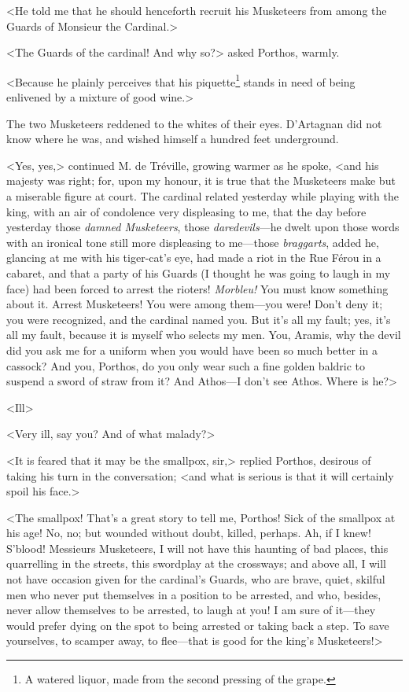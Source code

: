 <He told me that he should henceforth recruit his Musketeers from among the Guards of Monsieur the Cardinal.> 

<The Guards of the cardinal! And why so?> asked Porthos, warmly. 

<Because he plainly perceives that his piquette\footnote{A watered liquor, made from the second pressing of the grape.} stands in need of being enlivened by a mixture of good wine.> 

The two Musketeers reddened to the whites of their eyes. D'Artagnan did not know where he was, and wished himself a hundred feet underground. 

<Yes, yes,> continued M. de Tréville, growing warmer as he spoke, <and his majesty was right; for, upon my honour, it is true that the Musketeers make but a miserable figure at court. The cardinal related yesterday while playing with the king, with an air of condolence very displeasing to me, that the day before yesterday those \textit{damned Musketeers}, those \textit{daredevils}---he dwelt upon those words with an ironical tone still more displeasing to me---those \textit{braggarts}, added he, glancing at me with his tiger-cat's eye, had made a riot in the Rue Férou in a cabaret, and that a party of his Guards (I thought he was going to laugh in my face) had been forced to arrest the rioters! \textit{Morbleu!} You must know something about it. Arrest Musketeers! You were among them---you were! Don't deny it; you were recognized, and the cardinal named you. But it's all my fault; yes, it's all my fault, because it is myself who selects my men. You, Aramis, why the devil did you ask me for a uniform when you would have been so much better in a cassock? And you, Porthos, do you only wear such a fine golden baldric to suspend a sword of straw from it? And Athos---I don't see Athos. Where is he?> 

<Ill\longdash> 

<Very ill, say you? And of what malady?> 

<It is feared that it may be the smallpox, sir,> replied Porthos, desirous of taking his turn in the conversation; <and what is serious is that it will certainly spoil his face.> 

<The smallpox! That's a great story to tell me, Porthos! Sick of the smallpox at his age! No, no; but wounded without doubt, killed, perhaps. Ah, if I knew! S'blood! Messieurs Musketeers, I will not have this haunting of bad places, this quarrelling in the streets, this swordplay at the crossways; and above all, I will not have occasion given for the cardinal's Guards, who are brave, quiet, skilful men who never put themselves in a position to be arrested, and who, besides, never allow themselves to be arrested, to laugh at you! I am sure of it---they would prefer dying on the spot to being arrested or taking back a step. To save yourselves, to scamper away, to flee---that is good for the king's Musketeers!> 

